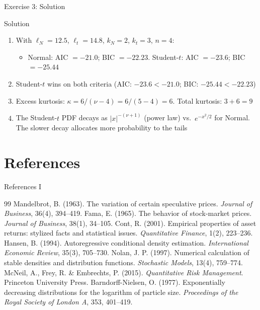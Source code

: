 \documentclass[9pt, aspectratio=169, t]{beamer}
\theoremstyle{definition}
\begin{document}
\begin{frame}{Exercise 3: Solution}
\begin{block}{Solution}
\begin{enumerate}
\item With $\ell_N = 12.5$, $\ell_t = 14.8$, $k_N = 2$, $k_t = 3$, $n = 4$:
\begin{itemize}
\item Normal: AIC $= -21.0$; BIC $= -22.23$. \; Student-$t$: AIC $= -23.6$; BIC $= -25.44$
\end{itemize}
\item Student-$t$ wins on both criteria (AIC: $-23.6 < -21.0$; BIC: $-25.44 < -22.23$)
\item Excess kurtosis: $\kappa = 6/(\nu - 4) = 6/(5-4) = 6$. Total kurtosis: $3 + 6 = 9$
\item The Student-$t$ PDF decays as $|x|^{-(\nu+1)}$ (power law) vs.\ $e^{-x^2/2}$ for Normal. The slower decay allocates more probability to the tails
\end{enumerate}
\end{block}
\end{frame}

\section*{References}

\begin{frame}{References I}
\small
\begin{thebibliography}{99}
 Mandelbrot, B. (1963). The variation of certain speculative prices. \textit{Journal of Business}, 36(4), 394--419.
 Fama, E. (1965). The behavior of stock-market prices. \textit{Journal of Business}, 38(1), 34--105.
 Cont, R. (2001). Empirical properties of asset returns: stylized facts and statistical issues. \textit{Quantitative Finance}, 1(2), 223--236.
 Hansen, B. (1994). Autoregressive conditional density estimation. \textit{International Economic Review}, 35(3), 705--730.
 Nolan, J. P. (1997). Numerical calculation of stable densities and distribution functions. \textit{Stochastic Models}, 13(4), 759--774.
 McNeil, A., Frey, R. \& Embrechts, P. (2015). \textit{Quantitative Risk Management}. Princeton University Press.
 Barndorff-Nielsen, O. (1977). Exponentially decreasing distributions for the logarithm of particle size. \textit{Proceedings of the Royal Society of London A}, 353, 401--419.
\end{thebibliography}
\end{frame}
\end{document}
